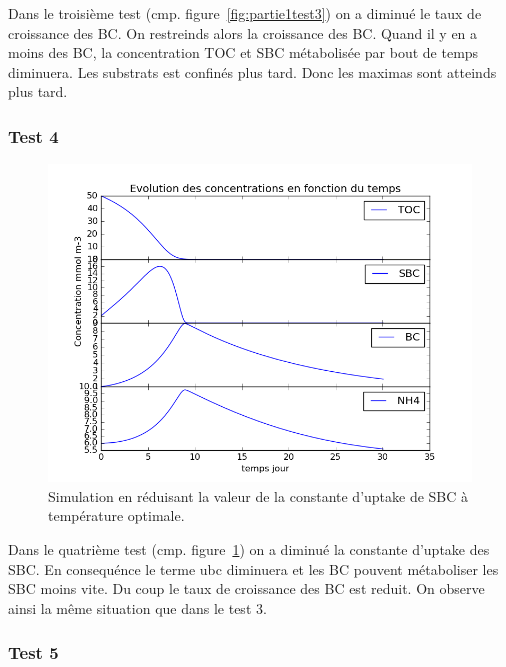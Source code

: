 \par{
Dans le troisième test (cmp. figure~\ref{fig:partie1test3}) on a diminué le taux de croissance des BC. On restreinds alors la croissance des BC.
Quand il y en a moins des BC, la concentration TOC et SBC métabolisée par bout de temps diminuera. Les
substrats est confinés plus tard. Donc les maximas sont atteinds plus tard.
}

\FloatBarrier
\newpage
\subsubsection{Test 4}

\begin{figure}[h!]
  \includegraphics[width=\textwidth]{partie1/Test4.png}
  \caption{Simulation en r\'eduisant la valeur de la constante d'uptake de SBC \`a temp\'erature optimale.}
  \label{fig:partie1test4}
\end{figure}

\par{
Dans le quatrième test (cmp. figure~\ref{fig:partie1test4}) on a diminué la constante d'uptake des SBC. En consequénce le terme ubc diminuera et
les BC pouvent métaboliser les SBC moins vite. Du coup le taux de croissance des BC est reduit. On observe
ainsi la même situation que dans le test 3.
}

\FloatBarrier
\newpage
\subsubsection{Test 5}

